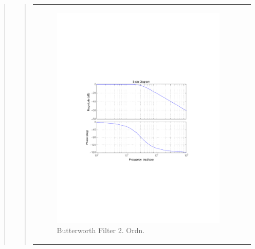 \begin{quote}
\begin{quote}
\begin{center}
\begin{tabular}{ll}
        \hspace{-4.5cm}
            \begin{minipage}{0.6\textwidth}
                
                \begin{figure}[H]
                    \label{fig:butter_2} 
                    \includegraphics[scale=0.7, trim = 3.5cm 7cm 3.5cm 7cm, clip]{Bilder/butter_2} %
                    \caption{Butterworth Filter 2. Ordn.}
                \end{figure}

            \end{minipage}
        

\end{tabular}
\end{center}
\end{quote}
\end{quote}
